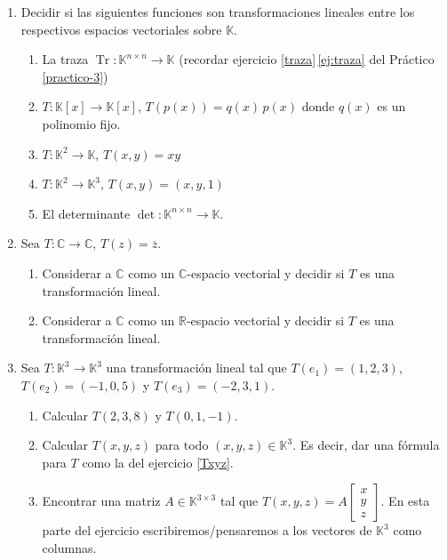 \begin{enumerate}[topsep=6pt, itemsep=.4cm]
\item Decidir si las siguientes funciones son transformaciones lineales entre los respectivos espacios vectoriales sobre $\mathbb{K}$.
\begin{enumerate}[resume, topsep=5pt,itemsep=5pt]
 \item La traza $\operatorname{Tr}:\mathbb{K}^{n\times n}\longrightarrow\mathbb{K}$ (recordar ejercicio \ref{traza}\,\ref{ej:traza} del Práctico  \ref{practico-3}) 
 \item $T:\mathbb{K}[x]\longrightarrow\mathbb{K}[x]$, $T(p(x))=q(x)\,p(x)$ donde $q(x)$ es un polinomio fijo.
 \item $T:\mathbb{K}^2\longrightarrow\mathbb{K}$, $T(x,y)=xy$
 \item $T:\mathbb{K}^2\longrightarrow\mathbb{K}^3$, $T(x,y)=(x,y,1)$
 \item El determinante $\operatorname{det}:\mathbb{K}^{n\times n}\longrightarrow\mathbb{K}$.
\end{enumerate}


\item Sea $T:\mathbb{C}\longrightarrow\mathbb{C}$, $T(z)=\overline{z}$.
\begin{enumerate}
 \item Considerar a $\mathbb{C}$ como un $\mathbb{C}$-espacio vectorial y decidir si $T$ es una transformación lineal.
 \item Considerar a $\mathbb{C}$ como un $\mathbb{R}$-espacio vectorial y decidir si $T$ es una transformación lineal.
\end{enumerate}


\item\label{T en la base} Sea $T:\mathbb{K}^3\longrightarrow\mathbb{K}^3$ una transformación lineal tal que $T(e_1)=(1,2,3)$, $T(e_2)=(-1,0,5)$ y $T(e_3)=(-2,3,1)$. 
    \begin{enumerate}
     \item Calcular $T(2,3,8)$ y $T(0,1,-1)$. 
     \item\label{T en la base b} Calcular $T(x,y,z)$ para todo $(x,y,z)\in\mathbb{K}^3$. Es decir, dar una fórmula para $T$ como la del ejercicio \ref{Txyz}.
     \item\label{matriz otro}  Encontrar una matriz $A\in\mathbb{K}^{3\times3}$ tal que $T(x,y,z)=A\begin{bmatrix}  x\\y\\z \end{bmatrix}$. En esta parte del ejercicio escribiremos/pensaremos a los vectores de $\mathbb{K}^3$ como columnas.
    \end{enumerate}


\end{enumerate}
